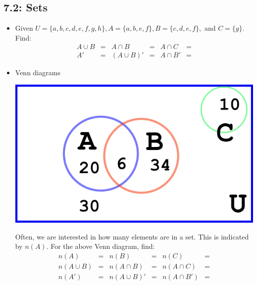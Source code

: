 \documentclass[12pt]{article}
\begin{document}
\subsection*{ 7.2: Sets}
\begin{itemize}
	\item Given $U= \{a,b,c,d,e,f,g,h\}, A = \{a,b,e,f\}, B= \{c,d,e,f\},$ and $C= \{g\}$. Find:
	\begin{align*}
		A \cup B &= & A \cap B&=  & A \cap C &= \\
		A' &=  & (A\cup B)' &= & A\cap B' &= 
	\end{align*}
	\item Venn diagrams \\
	\begin{center}
		\includegraphics[width=0.5\linewidth]{venn-3}
	\end{center}
	Often, we are interested in how many elements are in a set. This is indicated by $n(A)$. For the above Venn diagram, find:
	\begin{align*}
		n(A) &=   & n(B)&=   & n(C) &=  \\
		n(A \cup B) &=  & n(A \cap B)&=  &n( A \cap C) &=  \\
		n(A') &=  & n(A\cup B)' &=  & n(A\cap B') &= \\
	\end{align*}
\end{itemize}
\end{document}
